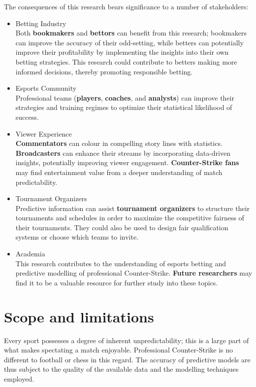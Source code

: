 The consequences of this research bears significance to a number of stakeholders:
\begin{itemize}
	\item Betting Industry\\
	Both \textbf{bookmakers} and \textbf{bettors} can benefit from this research; bookmakers can improve the accuracy of their odd-setting, while betters can potentially improve their profitability by implementing the insights into their own betting strategies. This research could contribute to betters making more informed decisions, thereby promoting responsible betting.
	\item Esports Community\\
	Professional teams (\textbf{players}, \textbf{coaches}, and \textbf{analysts}) can improve their strategies and training regimes to optimize their statistical likelihood of success.
	\item Viewer Experience\\\textbf{Commentators} can colour in compelling story lines with statistics. \textbf{Broadcasters} can enhance their streams by incorporating data-driven insights, potentially improving viewer engagement. \textbf{Counter-Strike fans} may find entertainment value from a deeper understanding of match predictability.
	\item Tournament Organizers\\
	Predictive information can assist \textbf{tournament organizers} to structure their tournaments and schedules in order to maximize the competitive fairness of their tournaments. They could also be used to design fair qualification systems or choose which teams to invite.
	\item Academia\\
	This research contributes to the understanding of esports betting and predictive modelling of professional Counter-Strike. \textbf{Future researchers} may find it to be a valuable resource for further study into these topics.
	
\end{itemize}

\section{Scope and limitations}

Every sport possesses a degree of inherent unpredictability; this is a large part of what makes spectating a match enjoyable. Professional Counter-Strike is no different to football or chess in this regard. The accuracy of predictive models are thus subject to the quality of the available data and the modelling techniques employed.

